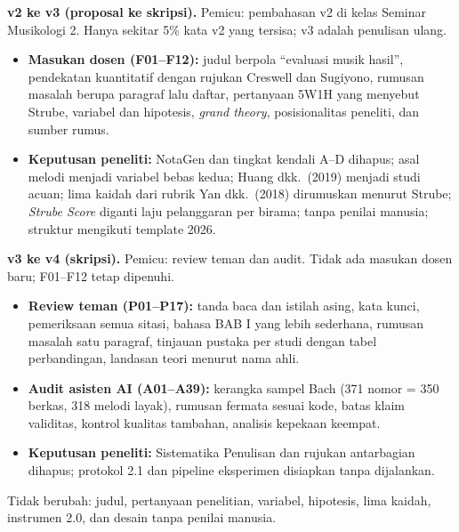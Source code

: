 \documentclass[a4paper,10pt]{article}
\begin{document}
\textbf{v2 ke v3 (proposal ke skripsi).} Pemicu: pembahasan v2 di kelas Seminar Musikologi 2. Hanya sekitar 5\% kata v2 yang tersisa; v3 adalah penulisan ulang.
\begin{itemize}
  \item \textcolor{dosen}{\textbf{Masukan dosen (F01--F12):}} judul berpola ``evaluasi musik hasil'', pendekatan kuantitatif dengan rujukan Creswell dan Sugiyono, rumusan masalah berupa paragraf lalu daftar, pertanyaan 5W1H yang menyebut Strube, variabel dan hipotesis, \textit{grand theory}, posisionalitas peneliti, dan sumber rumus.
  \item \textcolor{peneliti}{\textbf{Keputusan peneliti:}} NotaGen dan tingkat kendali A--D dihapus; asal melodi menjadi variabel bebas kedua; Huang dkk.\ (2019) menjadi studi acuan; lima kaidah dari rubrik Yan dkk.\ (2018) dirumuskan menurut Strube; \textit{Strube Score} diganti laju pelanggaran per birama; tanpa penilai manusia; struktur mengikuti template 2026.
\end{itemize}

\textbf{v3 ke v4 (skripsi).} Pemicu: review teman dan audit. Tidak ada masukan dosen baru; F01--F12 tetap dipenuhi.
\begin{itemize}
  \item \textcolor{teman}{\textbf{Review teman (P01--P17):}} tanda baca dan istilah asing, kata kunci, pemeriksaan semua sitasi, bahasa BAB I yang lebih sederhana, rumusan masalah satu paragraf, tinjauan pustaka per studi dengan tabel perbandingan, landasan teori menurut nama ahli.
  \item \textcolor{audit}{\textbf{Audit asisten AI (A01--A39):}} kerangka sampel Bach (371 nomor = 350 berkas, 318 melodi layak), rumusan fermata sesuai kode, batas klaim validitas, kontrol kualitas tambahan, analisis kepekaan keempat.
  \item \textcolor{peneliti}{\textbf{Keputusan peneliti:}} Sistematika Penulisan dan rujukan antarbagian dihapus; protokol 2.1 dan pipeline eksperimen disiapkan tanpa dijalankan.
\end{itemize}
Tidak berubah: judul, pertanyaan penelitian, variabel, hipotesis, lima kaidah, instrumen 2.0, dan desain tanpa penilai manusia.
\end{document}

